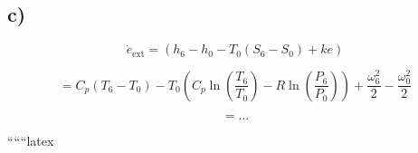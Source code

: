 

\subsection*{c)}

\[
\dot{e}_{\text{ext}} = (h_6 - h_0 - T_0(S_6 - S_0) + ke)
\]

\[
= C_p(T_6 - T_0) - T_0 \left( C_p \ln \left( \frac{T_6}{T_0} \right) - R \ln \left( \frac{P_6}{P_0} \right) \right) + \frac{\omega_6^2}{2} - \frac{\omega_0^2}{2}
\]

\[
= \ldots
\]

``````latex